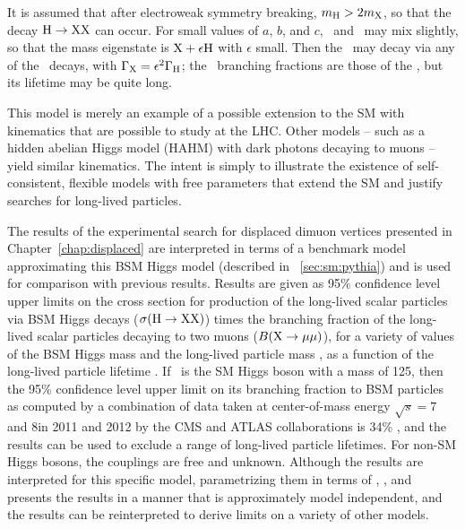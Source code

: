 It is assumed that after electroweak symmetry breaking, $m_{\mathrm{H}} > 2m_{\mathrm{X}}$, so that the decay $\mathrm{H} \to \mathrm{X}\mathrm{X}$ can occur.
For small values of $a$, $b$, and $c$, \PLLP\ and \PHiggs\ may mix slightly, so that the mass eigenstate is $\mathrm{X} + \epsilon \mathrm{H}$ with $\epsilon$ small.
Then the \PLLP\ may decay via any of the \PHiggs\ decays, with $\Gamma_{\mathrm{X}} = \epsilon^2 \Gamma_{\mathrm{H}}$; the \PLLP\ branching fractions are those of the \PHiggs, but its lifetime may be quite long.

This model is merely an example of a possible extension to the SM with kinematics that are possible to study at the LHC.
Other models -- such as a hidden abelian Higgs model (HAHM) with dark photons decaying to muons \cite{Curtin2015} -- yield similar kinematics.
The intent is simply to illustrate the existence of self-consistent, flexible models with free parameters that extend the SM and justify searches for long-lived particles.

The results of the experimental search for displaced dimuon vertices presented in Chapter~\ref{chap:displaced} are interpreted in terms of a benchmark model approximating this BSM Higgs model (described in \Sec~\ref{sec:sm:pythia}) and is used for comparison with previous results.
Results are given as 95\% confidence level upper limits on the cross section for production of the long-lived scalar particles via BSM Higgs decays ($\sigma(\mathrm{H}\to \mathrm{X}\mathrm{X})$) times the branching fraction of the long-lived scalar particles decaying to two muons ($B(\mathrm{X}\to\mathrm{\mu}\mathrm{\mu})$), for a variety of values of the BSM Higgs mass \mH and the long-lived particle mass \mX, as a function of the long-lived particle lifetime \cTau.
If \PHiggs\ is the SM Higgs boson with a mass of 125\GeV, then the 95\% confidence level upper limit on its branching fraction to BSM particles as computed by a combination of data taken at center-of-mass energy $\sqrt{s} = 7$ and 8\TeV in 2011 and 2012 by the CMS and ATLAS collaborations is 34\% \cite{Aad2016}, and the results can be used to exclude a range of long-lived particle lifetimes.
For non-SM Higgs bosons, the couplings are free and unknown.
Although the results are interpreted for this specific model, parametrizing them in terms of \mH, \mX, and \cTau presents the results in a manner that is approximately model independent, and the results can be reinterpreted to derive limits on a variety of other models.


